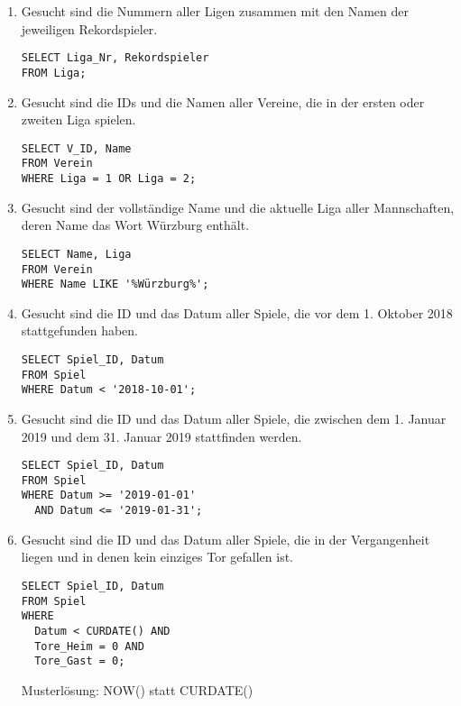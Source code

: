 \documentclass{bschlangaul-aufgabe}
\begin{document}
\begin{enumerate}
\item Gesucht sind die Nummern aller Ligen zusammen mit den Namen der
jeweiligen Rekordspieler.

\begin{verbatim}
SELECT Liga_Nr, Rekordspieler
FROM Liga;
\end{verbatim}


\item Gesucht sind die IDs und die Namen aller Vereine, die in der
ersten oder zweiten Liga spielen.

\begin{verbatim}
SELECT V_ID, Name
FROM Verein
WHERE Liga = 1 OR Liga = 2;
\end{verbatim}

%

\item Gesucht sind der vollständige Name und die aktuelle Liga aller
Mannschaften, deren Name das Wort Würzburg enthält.

\begin{verbatim}
SELECT Name, Liga
FROM Verein
WHERE Name LIKE '%Würzburg%';
\end{verbatim}

%

\item Gesucht sind die ID und das Datum aller Spiele, die vor dem 1.
Oktober 2018 stattgefunden haben.

\begin{verbatim}
SELECT Spiel_ID, Datum
FROM Spiel
WHERE Datum < '2018-10-01';
\end{verbatim}

%

\item Gesucht sind die ID und das Datum aller Spiele, die zwischen
dem 1. Januar 2019 und dem 31. Januar 2019 stattfinden werden.

\begin{verbatim}
SELECT Spiel_ID, Datum
FROM Spiel
WHERE Datum >= '2019-01-01'
  AND Datum <= '2019-01-31';
\end{verbatim}

%

\item Gesucht sind die ID und das Datum aller Spiele, die in der
Vergangenheit liegen und in denen kein einziges Tor gefallen ist.

\begin{verbatim}
SELECT Spiel_ID, Datum
FROM Spiel
WHERE
  Datum < CURDATE() AND
  Tore_Heim = 0 AND
  Tore_Gast = 0;
\end{verbatim}

Musterlösung: NOW() statt CURDATE()

\end{enumerate}
\end{document}
